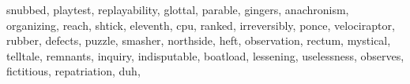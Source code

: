 \documentclass[
  12pt,
]{book}
\newenvironment{Shaded}{\begin{snugshade}}{\end{snugshade}}
\newcommand{\NormalTok}[1]{#1}
\newcommand{\StringTok}[1]{\textcolor[rgb]{0.31,0.60,0.02}{#1}}
\begin{document}
\begin{Shaded}
\begin{Highlighting}[]
                \StringTok{\textquotesingle{}snubbed\textquotesingle{}}\NormalTok{, }\StringTok{\textquotesingle{}playtest\textquotesingle{}}\NormalTok{, }\StringTok{\textquotesingle{}replayability\textquotesingle{}}\NormalTok{, }\StringTok{\textquotesingle{}glottal\textquotesingle{}}\NormalTok{, }\StringTok{\textquotesingle{}parable\textquotesingle{}}\NormalTok{, }\StringTok{\textquotesingle{}gingers\textquotesingle{}}\NormalTok{,}
                \StringTok{\textquotesingle{}anachronism\textquotesingle{}}\NormalTok{, }\StringTok{\textquotesingle{}organizing\textquotesingle{}}\NormalTok{, }\StringTok{\textquotesingle{}reach\textquotesingle{}}\NormalTok{, }\StringTok{\textquotesingle{}shtick\textquotesingle{}}\NormalTok{, }\StringTok{\textquotesingle{}eleventh\textquotesingle{}}\NormalTok{, }\StringTok{\textquotesingle{}cpu\textquotesingle{}}\NormalTok{, }\StringTok{\textquotesingle{}ranked\textquotesingle{}}\NormalTok{,}
                \StringTok{\textquotesingle{}irreversibly\textquotesingle{}}\NormalTok{, }\StringTok{\textquotesingle{}ponce\textquotesingle{}}\NormalTok{, }\StringTok{\textquotesingle{}velociraptor\textquotesingle{}}\NormalTok{, }\StringTok{\textquotesingle{}rubber\textquotesingle{}}\NormalTok{, }\StringTok{\textquotesingle{}defects\textquotesingle{}}\NormalTok{, }\StringTok{\textquotesingle{}puzzle\textquotesingle{}}\NormalTok{,}
                \StringTok{\textquotesingle{}smasher\textquotesingle{}}\NormalTok{, }\StringTok{\textquotesingle{}northside\textquotesingle{}}\NormalTok{, }\StringTok{\textquotesingle{}heft\textquotesingle{}}\NormalTok{, }\StringTok{\textquotesingle{}observation\textquotesingle{}}\NormalTok{, }\StringTok{\textquotesingle{}rectum\textquotesingle{}}\NormalTok{, }\StringTok{\textquotesingle{}mystical\textquotesingle{}}\NormalTok{,}
                \StringTok{\textquotesingle{}telltale\textquotesingle{}}\NormalTok{, }\StringTok{\textquotesingle{}remnants\textquotesingle{}}\NormalTok{, }\StringTok{\textquotesingle{}inquiry\textquotesingle{}}\NormalTok{, }\StringTok{\textquotesingle{}indisputable\textquotesingle{}}\NormalTok{, }\StringTok{\textquotesingle{}boatload\textquotesingle{}}\NormalTok{, }\StringTok{\textquotesingle{}lessening\textquotesingle{}}\NormalTok{,}
                \StringTok{\textquotesingle{}uselessness\textquotesingle{}}\NormalTok{, }\StringTok{\textquotesingle{}observes\textquotesingle{}}\NormalTok{, }\StringTok{\textquotesingle{}fictitious\textquotesingle{}}\NormalTok{, }\StringTok{\textquotesingle{}repatriation\textquotesingle{}}\NormalTok{, }\StringTok{\textquotesingle{}duh\textquotesingle{}}\NormalTok{,}

\end{Highlighting}
\end{Shaded}
\end{document}
